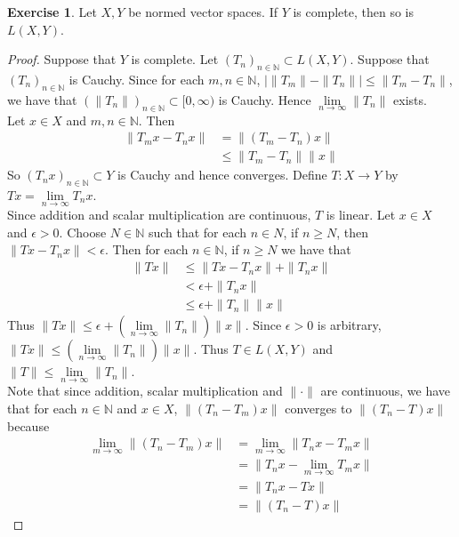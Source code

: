 \documentclass[12pt]{amsart}
\theoremstyle{definition}
\newtheorem{ex}[definition]{Exercise}
\newcommand{\ep}{\epsilon}
\newcommand{\N}{\mathbb{N}}
\newcommand{\Rg}{[0,\infty)}
\newcommand{\limn}{\lim \limits_{n \rightarrow \infty}}
\begin{document}
	\begin{ex}
		Let $X,Y$ be normed vector spaces. If $Y$ is complete, then so is $L(X,Y)$.
	\end{ex}
	
	\begin{proof}
		Suppose that $Y$ is complete. Let $(T_n)_{n \in \N} \subset L(X,Y)$. Suppose that $(T_n)_{n \in \N}$ is Cauchy. Since for each $m,n \in \N$, $\big\vert \|T_m \|- \|T_n \|\big\vert \leq \|T_m -T_n \|$, we have that $(\|T_n \|)_{n \in \N} \subset \Rg$ is Cauchy. Hence $\lim\limits_{n \rightarrow \infty}\|T_n \|$ exists. \vspace{1cm} \\ Let $x \in X$ and $m,n \in \N$. Then 
		\begin{align*}
			\|T_m x - T_n x \|
			&= \|(T_m-T_n) x \|\\
			&\leq \|T_m-T_n \|\|x \|
		\end{align*}
		So $(T_nx)_{n \in \N} \subset Y$ is Cauchy and hence converges. Define $T:X \rightarrow Y$ by $Tx = \lim\limits_{n \rightarrow \infty} T_nx$. \vspace{1cm}\\
		Since addition and scalar multiplication are continuous, $T$ is linear. Let $x \in X$ and $\ep>0$. Choose $N \in \N$ such that for each $n \in N$, if $n \geq N$, then $\|Tx - T_n x\|< \ep$. Then for each $n \in \N$, if $n \geq N$ we have that 
		\begin{align*}
			\|Tx\|
			&\leq \|Tx-T_nx \|+ \|T_nx \|\\
			&< \ep + \|T_nx \|\\
			&\leq \ep + \|T_n \|\|x \|
		\end{align*}  
		Thus $\|Tx \|\leq \ep +(\lim\limits_{n \rightarrow \infty} \|T_n \|) \|x \|$. Since $\ep >0$ is arbitrary, $\|Tx \|\leq (\lim\limits_{n \rightarrow \infty} \|T_n \|) \|x \|$. Thus $T \in L(X,Y)$ and $\|T \|\leq \limn \|T_n \|$. \vspace{1cm} \\
		Note that since addition, scalar multiplication and $\|\cdot \|$ are continuous, we have that for each $n \in \N$ and $x \in X$, $\|(T_n-T_m)x \|$ converges to $\|(T_n-T)x \|$ because 
		\begin{align*}
			\lim_{m \rightarrow \infty} \|(T_n-T_m)x \|
			&= \lim_{m \rightarrow \infty} \|T_nx-T_mx \|\\
			&= \|T_nx-\lim_{m \rightarrow \infty}T_mx \|\\
			&=\|T_nx-Tx \|\\
			&= \|(T_n-T)x \|

\end{align*}
\end{proof}
\end{document}
